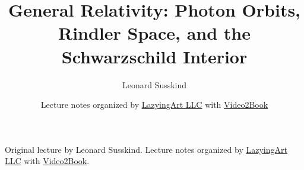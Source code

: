 \documentclass[11pt,oneside]{book}
\begin{document}
\frontmatter
\hypersetup{pageanchor=false}
\title{General Relativity: Photon Orbits, Rindler Space, and the Schwarzschild Interior}
\author{Leonard Susskind}
\date{Lecture notes organized by \href{https://lazying.art}{LazyingArt LLC} with \href{https://github.com/lachlanchen/Video2Book}{Video2Book}}
\maketitle
\begin{center}
\small Original lecture by Leonard Susskind. Lecture notes organized by \href{https://lazying.art}{LazyingArt LLC} with \href{https://github.com/lachlanchen/Video2Book}{Video2Book}.
\end{center}
\clearpage
\hypersetup{pageanchor=true}
\mainmatter

\end{document}
